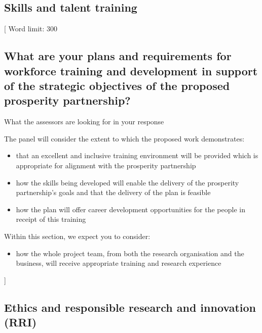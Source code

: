 \documentclass{article}
\newcommand{\desc}[1]{{\leavevmode\color{blue}[#1]}}
\begin{document}
% 

\subsection{Skills and talent training}

\desc{
Word limit: 300

\subsection*{What are your plans and requirements for workforce training and development in
support of the strategic objectives of the proposed prosperity partnership?}

What the assessors are looking for in your response

The panel will consider the extent to which the proposed work demonstrates:

\begin{itemize}

    \item that an excellent and inclusive training environment will be provided
        which is appropriate for alignment with the prosperity partnership

    \item how the skills being developed will enable the delivery of the
        prosperity partnership’s goals and that the delivery of the plan is
        feasible

    \item how the plan will offer career development opportunities for the
        people in receipt of this training

\end{itemize}

Within this section, we expect you to consider:

\begin{itemize}

    \item how the whole project team, from both the research organisation and
        the business, will receive appropriate training and research experience

\end{itemize}

}

% 

\subsection{Ethics and responsible research and innovation (RRI)}
\end{document}
